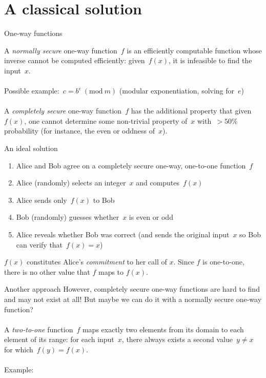 \documentclass{beamer}
\begin{document}
\part{A classical solution~\cite{blum1981coin}} \frame{\partpage}

\begin{frame}{One-way functions}

    A \emph{normally secure} one-way function~$f$ is an efficiently computable function whose inverse cannot be computed efficiently: given~$f(x)$, it is infeasible to find the input~$x$. \\~\\
    Possible example:~$c = b^e \ (\textrm{mod}\ m)$ (modular exponentiation, solving for~$e$)\\~\\

    A \emph{completely secure} one-way function~$f$ has the additional property that given~$f(x)$, one cannot determine some non-trivial property of~$x$ with~$>50\%$ probability (for instance, the even or oddness of~$x$).
\end{frame}

\begin{frame}{An ideal solution}
    \begin{enumerate}
        \item Alice and Bob agree on a completely secure one-way, one-to-one function~$f$
        \item Alice (randomly) selects an integer~$x$ and computes~$f(x)$
        \item Alice sends only~$f(x)$ to Bob
        \item Bob (randomly) guesses whether~$x$ is even or odd
        \item Alice reveals whether Bob was correct (and sends the original input~$x$ so Bob can verify that~$f(x) = x$)
    \end{enumerate}

    $f(x)$ constitutes Alice's \emph{commitment} to her call of $x$. Since $f$ is one-to-one, there is no other value that $f$ maps to $f(x)$.
\end{frame}


\begin{frame}{Another approach}
    However, completely secure one-way functions are hard to find and may not exist at all! But maybe we can do it with a normally secure one-way function?\\~\\

    A \emph{two-to-one} function~$f$ maps exactly two elements from its domain to each element of its range: for each input~$x$, there always exists a second value~$y \neq x$ for which~$f(y) = f(x)$.\\~\\

    Example: 

\end{frame}
\end{document}
